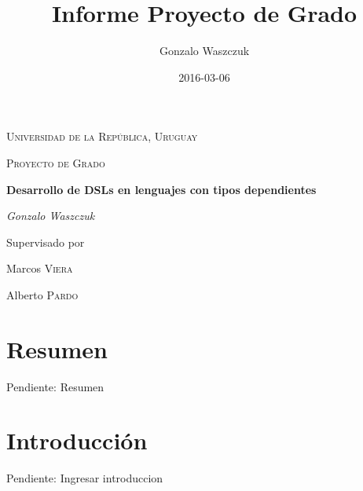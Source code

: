 \documentclass[a4paper,oneside,openany]{book}
\title{Informe Proyecto de Grado}
\author{Gonzalo Waszczuk}
\begin{document}
\frontmatter

\begin{titlepage}
	\centering
	{\scshape\LARGE Universidad de la República, Uruguay \par}
	\vspace{1cm}
	{\scshape\Large Proyecto de Grado\par}
	\vspace{1.5cm}
	{\huge\bfseries Desarrollo de DSLs en lenguajes con tipos dependientes\par}
	\vspace{2cm}
	{\Large\itshape Gonzalo Waszczuk\par}
	\vfill
	Supervisado por\par
	Marcos \textsc{Viera}\par
        Alberto \textsc{Pardo}
	\vfill

	{\large \date{2016-03-06}\par}
\end{titlepage}

\chapter*{Resumen}

Pendiente: Resumen

\tableofcontents


\mainmatter

\cleardoublepage

\chapter{Introducción}

Pendiente: Ingresar introduccion









\backmatter


\printbibliography

\end{document}
